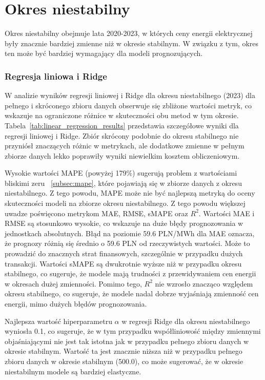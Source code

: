 \section{Okres niestabilny}
\label{sec:okres_niestabilny}

Okres niestabilny obejmuje lata 2020-2023, w których ceny energii elektrycznej były znacznie bardziej zmienne niż w okresie stabilnym. W związku z tym, okres ten może być bardziej wymagający dla modeli prognozujących.

\subsubsection{Regresja liniowa i Ridge}

W analizie wyników regresji liniowej i Ridge dla okresu niestabilnego (2023) dla pełnego i skróconego zbioru danych obserwuje się zbliżone wartości metryk, co wskazuje na ograniczone różnice w skuteczności obu metod w tym okresie. Tabela~\ref{tab:linear_regression_results} przedstawia szczegółowe wyniki dla regresji liniowej i Ridge. Zbiór skrócony podobnie do okresu stabilnego nie przyniósł znaczących różnic w metrykach, ale dodatkowe zmienne w pełnym zbiorze danych lekko poprawiły wyniki niewielkim kosztem obliczeniowym. 

Wysokie wartości MAPE (powyżej 179\%) sugerują problem z wartościami bliskimi zeru ~\ref{subsec:mape}, które pojawiają się w zbiorze danych z okresu niestabilnego. Z tego powodu, MAPE może nie być najlepszą metryką do oceny skuteczności modeli na zbiorze okresu niestabilnego. Z tego powodu większej uwadze poświęcono metrykom MAE, RMSE, sMAPE oraz \(R^2\). Wartości MAE i RMSE są stosunkowo wysokie, co wskazuje na duże błędy prognozowania w jednostkach absolutnych. Błąd na poziomie 59.6 PLN/MWh dla MAE oznacza, że prognozy różnią się średnio o 59.6 PLN od rzeczywistych wartości. Może to prowadzić do znacznych strat finansowych, szczególnie w przypadku dużych transakcji. Wartości sMAPE są dwukrotnie wyższe niż w przypadku okresu stabilnego, co sugeruje, że modele mają trudności z przewidywaniem cen energii w okresach dużej zmienności. Pomimo tego, \(R^2\) nie wzrosło znacząco względem okresu stabilnego, co sugeruje, że modele nadal dobrze wyjaśniają zmienność cen energii, mimo dużych błędów prognozowania. 

Najlepsza wartość hiperparametru \(\alpha\) w regresji Ridge dla okresu niestabilnego wyniosła 0.1, co sugeruje, że w tym przypadku współliniowość między zmiennymi objaśniającymi nie jest tak istotna jak w przypadku pełnego zbioru danych w okresie stabilnym. Wartość ta jest znacznie niższa niż w przypadku pełnego zbioru danych w okresie stabilnym (500.0), co może sugerować, że w okresie niestabilnym modele są bardziej elastyczne.

